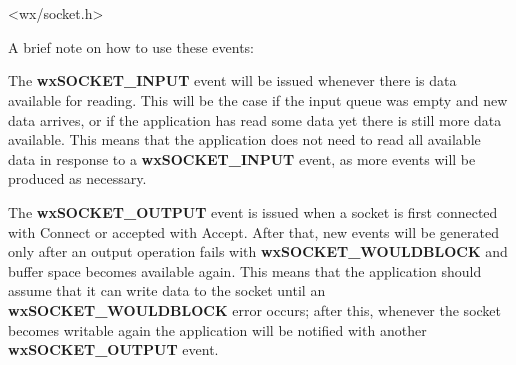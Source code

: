 \section{}\label{wxsocketbase}




<wx/socket.h>


\twocolwidtha{7cm}
\begin{twocollist}\itemsep=0pt
\end{twocollist}


\twocolwidtha{7cm}
\begin{twocollist}\itemsep=0pt
\end{twocollist}

A brief note on how to use these events:

The {\bf wxSOCKET\_INPUT} event will be issued whenever there is data
available for reading. This will be the case if the input queue was
empty and new data arrives, or if the application has read some data
yet there is still more data available. This means that the application
does not need to read all available data in response to a
{\bf wxSOCKET\_INPUT} event, as more events will be produced as
necessary.

The {\bf wxSOCKET\_OUTPUT} event is issued when a socket is first
connected with Connect or accepted with Accept. After that, new
events will be generated only after an output operation fails
with {\bf wxSOCKET\_WOULDBLOCK} and buffer space becomes available
again. This means that the application should assume that it
can write data to the socket until an {\bf wxSOCKET\_WOULDBLOCK}
error occurs; after this, whenever the socket becomes writable
again the application will be notified with another
{\bf wxSOCKET\_OUTPUT} event.

